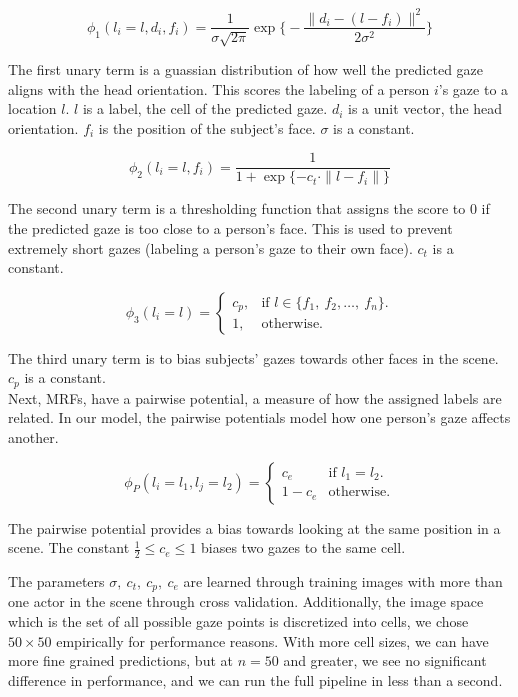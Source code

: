 \documentclass[10pt,twocolumn,letterpaper]{article}
\begin{document}
\begin{equation}
  \phi_1(l_i = l, d_i, f_i) = \frac{1}{\sigma \sqrt{2 \pi}} \exp{\big\{-\frac{\|d_i - (l - f_i)\|^2}{2 \sigma^2}\big\}}
\end{equation}

The first unary term is a guassian distribution of how well the predicted gaze aligns with the head orientation. This scores the labeling of a person $i$'s gaze to a location $l$. $l$ is a label, the cell of the predicted gaze. $d_i$ is a unit vector, the head orientation. $f_i$ is the position of the subject's face. $\sigma$ is a constant.

\begin{equation}
  \phi_2(l_i = l, f_i) = \frac{1}{1 + \exp{\{-c_t \cdot \|l - f_i\|\}}}
\end{equation}

The second unary term is a thresholding function that assigns the score to $0$ if the predicted gaze is too close to a person's face. This is used to prevent extremely short gazes (labeling a person's gaze to their own face). $c_t$ is a constant.

\begin{equation}
  \phi_3(l_i = l) = \begin{cases}
    c_p, & \text{if $l \in \{f_1,\ f_2,\dots,\ f_n\}$}.\\
    1, & \text{otherwise}.
  \end{cases}
\end{equation}

The third unary term is to bias subjects' gazes towards other faces in the scene. $c_p$ is a constant. \\

Next, MRFs, have a pairwise potential, a measure of how the assigned labels are related. In our model, the pairwise potentials model how one person's gaze affects another.

\begin{equation}
  \phi_P(l_i = l_1, l_j = l_2) = \begin{cases}
    c_e & \text{if $l_1 = l_2$}.\\
    1 - c_e & \text{otherwise}.
  \end{cases}
\end{equation}

The pairwise potential provides a bias towards looking at the same position in a scene. The constant $\frac{1}{2} \leq c_e \leq 1$ biases two gazes to the same cell.

The parameters $\sigma,\ c_t,\ c_p,\ c_e$ are learned through training images with more than one actor in the scene through cross validation.
Additionally, the image space which is the set of all possible gaze points is discretized into cells, we chose $50 \times 50$ empirically for performance reasons. With more cell sizes, we can have more fine grained predictions, but at $n = 50$ and greater, we see no significant difference in performance, and we can run the full pipeline in less than a second.
\end{document}
